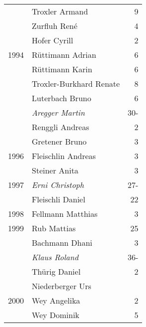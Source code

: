 {\begin{longtable}{ l l r }
                      & Troxler Armand                            & 9           \\
                      & Zurfluh René                              & 4           \\
                      & Hofer Cyrill                              & 2           \\
        1994          & Rüttimann Adrian                          & 6           \\
                      & Rüttimann Karin                           & 6           \\
                      & Troxler-Burkhard Renate                   & 8           \\
                      & Luterbach Bruno                           & 6           \\
                      & \emph{Aregger Martin}                     & 30-         \\
                      & Renggli Andreas                           & 2           \\
                      & Gretener Bruno                            & 3           \\
        1996          & Fleischlin Andreas                        & 3           \\
                      & Steiner Anita                             & 3           \\
        1997          & \emph{Erni Christoph}                     & 27-         \\
                      & Fleischli Daniel                          & 22          \\
        1998          & Fellmann Matthias                         & 3           \\
        1999          & Rub Mattias                               & 25          \\
                      & Bachmann Dhani                            & 3           \\
                      & \emph{Klaus Roland}                       & 36-         \\
                      & Thürig Daniel                             & 2           \\
                      & Niederberger Urs                          &             \\
        2000          & Wey Angelika                              & 2           \\
                      & Wey Dominik                               & 5           \\

\end{longtable}}
